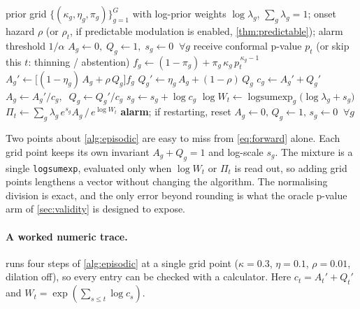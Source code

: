 \begin{algorithm}[t]
\caption{One frame of the episodic e-process, vectorised over the prior grid}
\label{alg:episodic}
\begin{algorithmic}[1]
\Require prior grid $\{(\kappa_g, \eta_g, \pi_g)\}_{g=1}^G$ with log-prior
  weights $\log\lambda_g$, $\sum_g \lambda_g = 1$; onset hazard $\rho$ (or
  $\rho_t$, if predictable modulation is enabled, \cref{thm:predictable});
  alarm threshold $1/\alpha$
\State $A_g \gets 0,\; Q_g \gets 1,\; s_g \gets 0 \;\; \forall g$
  \State receive conformal p-value $p_t$ (or skip this $t$: thinning / abstention)
    \State $f_g \gets (1 - \pi_g) + \pi_g\, \kappa_g\, p_t^{\,\kappa_g - 1}$
    \State $A_g' \gets \bigl[(1-\eta_g)\, A_g + \rho\, Q_g\bigr] f_g$
    \State $Q_g' \gets \eta_g\, A_g + (1-\rho)\, Q_g$
    \State $c_g \gets A_g' + Q_g'$
    \State $A_g \gets A_g' / c_g,\;\; Q_g \gets Q_g' / c_g$
    \State $s_g \gets s_g + \log c_g$
  \EndFor
  \State $\log W_t \gets \operatorname{logsumexp}_g\bigl(\log\lambda_g + s_g\bigr)$
  \State $\Pi_t \gets \sum_g \lambda_g\, e^{s_g} A_g \,\big/\, e^{\log W_t}$
    \State \textbf{alarm}; if restarting, reset $A_g \gets 0,\, Q_g \gets 1,\,
      s_g \gets 0\;\; \forall g$
  \EndIf
\EndFor
\end{algorithmic}
\end{algorithm}

Two points about \cref{alg:episodic} are easy to miss from \cref{eq:forward} alone. Each grid point keeps its own invariant $A_g + Q_g = 1$ and log-scale $s_g$. The mixture is a single \texttt{logsumexp}, evaluated only when $\log W_t$ or $\Pi_t$ is read out, so adding grid points lengthens a vector without changing the algorithm. The normalising division is exact, and the only error beyond rounding is what the oracle p-value arm of \cref{sec:validity} is designed to expose.

\paragraph{A worked numeric trace.}
 runs four steps of \cref{alg:episodic} at a single grid point ($\kappa = 0.3$, $\eta = 0.1$, $\rho = 0.01$, dilation off), so every entry can be checked with a calculator. Here $c_t = A_t' + Q_t'$ and $W_t = \exp(\sum_{s\le t} \log c_s)$.

